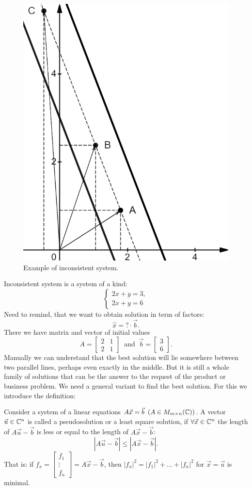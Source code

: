     \begin{figure}
        \includegraphics[height=0.45\columnwidth, width=0.36\columnwidth]{lectures/images/inconsistent_system.png}
        \caption*{\scriptsize{Example of inconsistent system.}}
        \label{fig:inconsistent_with_vectors}
    \end{figure}
    Inconsistent system is a system of a kind:
        \[
            \left\{
                \begin{array}{c}
                    2x+y=3,\\
                    2x+y=6
                \end{array}
            \right.  
        \]
    Need to remind, that we want to obtain solution in term of factors:
    \[
         \hat{x} = ? \cdot \vec{b}.
    \]
    There we have matrix and vector of initial values \[A = \begin{bmatrix}
        2 & 1\\
        2 & 1
    \end{bmatrix} \ \text{ and }\ \vec{b} = \begin{bmatrix}
        3 \\ 6
    \end{bmatrix}.\] 
    Manually we can understand that the best solution will lie somewhere between two parallel lines, perhaps even exactly in the middle. But it is still a whole family of solutions that can be the answer to the request of the product or business problem. We need a general variant to find the best solution. For this we introduce the definition:
    \par
    \begin{definition}{}{}
        Consider a system of a linear equations $A\vec{x} = \vec{b} \ \left(A \in M_{m\times n}(\mathbb{C})\right)$. A vector $\vec{u} \in \mathbb{C}^n$ is called a pseudosolution or a least square solution, if $\forall \vec{x} \in \mathbb{C}^n$ the length of $A\vec{u} - \vec{b}$ is less or equal to the length of $A\vec{x} - \vec{b}$:
        \[
            \left| A\vec{u} - \vec{b} \right| \leq \left| A\vec{x} - \vec{b} \right|. 
        \]
        That is: if $f_x = \begin{bmatrix}
            f_1 \\
            \vdots\\
            f_n
        \end{bmatrix} = A\vec{x}-\vec{b}$, then $|f_x|^2 = |f_1|^2 + \ldots + |f_n|^2$ for $\vec{x}=\vec{u}$ is minimal.
    \end{definition}
